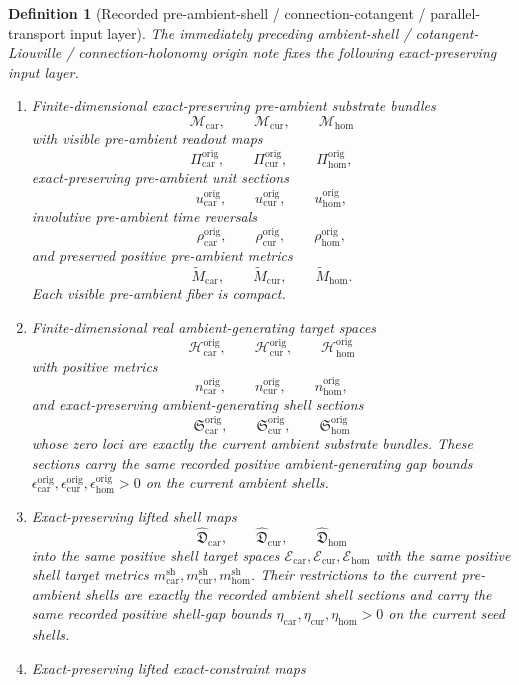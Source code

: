 \documentclass[11pt]{article}
\newcommand{\TensorShellTarget}{\mathcal E_{\mathrm{car}}}
\newcommand{\CurShellTarget}{\mathcal E_{\mathrm{cur}}}
\newcommand{\HomShellTarget}{\mathcal E_{\mathrm{hom}}}
\newcommand{\TensorShellMetric}{m_{\mathrm{car}}^{\mathrm{sh}}}
\newcommand{\CurShellMetric}{m_{\mathrm{cur}}^{\mathrm{sh}}}
\newcommand{\HomShellMetric}{m_{\mathrm{hom}}^{\mathrm{sh}}}
\newcommand{\TensorShellGap}{\eta_{\mathrm{car}}}
\newcommand{\CurShellGap}{\eta_{\mathrm{cur}}}
\newcommand{\HomShellGap}{\eta_{\mathrm{hom}}}
\newcommand{\TensorOriginSpace}{\mathcal M_{\mathrm{car}}}
\newcommand{\CurOriginSpace}{\mathcal M_{\mathrm{cur}}}
\newcommand{\HomOriginSpace}{\mathcal M_{\mathrm{hom}}}
\newcommand{\TensorOriginRead}{\Pi_{\mathrm{car}}^{\mathrm{orig}}}
\newcommand{\CurOriginRead}{\Pi_{\mathrm{cur}}^{\mathrm{orig}}}
\newcommand{\HomOriginRead}{\Pi_{\mathrm{hom}}^{\mathrm{orig}}}
\newcommand{\TensorOriginUnit}{u_{\mathrm{car}}^{\mathrm{orig}}}
\newcommand{\CurOriginUnit}{u_{\mathrm{cur}}^{\mathrm{orig}}}
\newcommand{\HomOriginUnit}{u_{\mathrm{hom}}^{\mathrm{orig}}}
\newcommand{\TensorOriginTimeRev}{\rho_{\mathrm{car}}^{\mathrm{orig}}}
\newcommand{\CurOriginTimeRev}{\rho_{\mathrm{cur}}^{\mathrm{orig}}}
\newcommand{\HomOriginTimeRev}{\rho_{\mathrm{hom}}^{\mathrm{orig}}}
\newcommand{\TensorOriginSpaceMetric}{\widetilde M_{\mathrm{car}}}
\newcommand{\CurOriginSpaceMetric}{\widetilde M_{\mathrm{cur}}}
\newcommand{\HomOriginSpaceMetric}{\widetilde M_{\mathrm{hom}}}
\newcommand{\TensorOriginTarget}{\mathcal H_{\mathrm{car}}^{\mathrm{orig}}}
\newcommand{\CurOriginTarget}{\mathcal H_{\mathrm{cur}}^{\mathrm{orig}}}
\newcommand{\HomOriginTarget}{\mathcal H_{\mathrm{hom}}^{\mathrm{orig}}}
\newcommand{\TensorOriginTargetMetric}{n_{\mathrm{car}}^{\mathrm{orig}}}
\newcommand{\CurOriginTargetMetric}{n_{\mathrm{cur}}^{\mathrm{orig}}}
\newcommand{\HomOriginTargetMetric}{n_{\mathrm{hom}}^{\mathrm{orig}}}
\newcommand{\TensorOriginSection}{\mathfrak S_{\mathrm{car}}^{\mathrm{orig}}}
\newcommand{\CurOriginSection}{\mathfrak S_{\mathrm{cur}}^{\mathrm{orig}}}
\newcommand{\HomOriginSection}{\mathfrak S_{\mathrm{hom}}^{\mathrm{orig}}}
\newcommand{\TensorOriginGap}{\epsilon_{\mathrm{car}}^{\mathrm{orig}}}
\newcommand{\CurOriginGap}{\epsilon_{\mathrm{cur}}^{\mathrm{orig}}}
\newcommand{\HomOriginGap}{\epsilon_{\mathrm{hom}}^{\mathrm{orig}}}
\newcommand{\TensorLiftedShellSection}{\widehat{\mathfrak D}_{\mathrm{car}}}
\newcommand{\CurLiftedShellSection}{\widehat{\mathfrak D}_{\mathrm{cur}}}
\newcommand{\HomLiftedShellSection}{\widehat{\mathfrak D}_{\mathrm{hom}}}
\newtheorem{definition}{Definition}
\begin{document}
\begin{definition}[Recorded pre-ambient-shell / connection-cotangent / parallel-transport input layer]
\label{def:recorded_origin_layer}
The immediately preceding ambient-shell / cotangent-Liouville / connection-holonomy origin note fixes the following exact-preserving input layer.
\begin{enumerate}
    \item Finite-dimensional exact-preserving pre-ambient substrate bundles
    \[
    \TensorOriginSpace,\qquad
    \CurOriginSpace,\qquad
    \HomOriginSpace
    \]
    with visible pre-ambient readout maps
    \[
    \TensorOriginRead,\qquad
    \CurOriginRead,\qquad
    \HomOriginRead,
    \]
    exact-preserving pre-ambient unit sections
    \[
    \TensorOriginUnit,\qquad
    \CurOriginUnit,\qquad
    \HomOriginUnit,
    \]
    involutive pre-ambient time reversals
    \[
    \TensorOriginTimeRev,\qquad
    \CurOriginTimeRev,\qquad
    \HomOriginTimeRev,
    \]
    and preserved positive pre-ambient metrics
    \[
    \TensorOriginSpaceMetric,\qquad
    \CurOriginSpaceMetric,\qquad
    \HomOriginSpaceMetric.
    \]
    Each visible pre-ambient fiber is compact.
    \item Finite-dimensional real ambient-generating target spaces
    \[
    \TensorOriginTarget,\qquad
    \CurOriginTarget,\qquad
    \HomOriginTarget
    \]
    with positive metrics
    \[
    \TensorOriginTargetMetric,\qquad
    \CurOriginTargetMetric,\qquad
    \HomOriginTargetMetric,
    \]
    and exact-preserving ambient-generating shell sections
    \[
    \TensorOriginSection,\qquad
    \CurOriginSection,\qquad
    \HomOriginSection
    \]
    whose zero loci are exactly the current ambient substrate bundles. These sections carry the same recorded positive ambient-generating gap bounds \(\TensorOriginGap,\CurOriginGap,\HomOriginGap>0\) on the current ambient shells.
    \item Exact-preserving lifted shell maps
    \[
    \TensorLiftedShellSection,\qquad
    \CurLiftedShellSection,\qquad
    \HomLiftedShellSection
    \]
    into the same positive shell target spaces \(\TensorShellTarget,\CurShellTarget,\HomShellTarget\) with the same positive shell target metrics \(\TensorShellMetric,\CurShellMetric,\HomShellMetric\). Their restrictions to the current pre-ambient shells are exactly the recorded ambient shell sections and carry the same recorded positive shell-gap bounds \(\TensorShellGap,\CurShellGap,\HomShellGap>0\) on the current seed shells.
    \item Exact-preserving lifted exact-constraint maps

\end{enumerate}
\end{definition}
\end{document}
